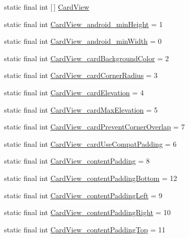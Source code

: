 \begin{DoxyCompactItemize}
\item 
static final int \mbox{[}$\,$\mbox{]} \hyperlink{classproject4_1_1xaria_1_1R_1_1styleable_abef2e3d3e2b11dd786470094dbc57ea4}{Card\+View}
\item 
static final int \hyperlink{classproject4_1_1xaria_1_1R_1_1styleable_a2713d27646c85746d8ab8bd6ccc6c04f}{Card\+View\+\_\+android\+\_\+min\+Height} = 1
\item 
static final int \hyperlink{classproject4_1_1xaria_1_1R_1_1styleable_a656ba8dea65186ef0004bd7170c8fa84}{Card\+View\+\_\+android\+\_\+min\+Width} = 0
\item 
static final int \hyperlink{classproject4_1_1xaria_1_1R_1_1styleable_ab56702194685aec3a36f901e12d1f432}{Card\+View\+\_\+card\+Background\+Color} = 2
\item 
static final int \hyperlink{classproject4_1_1xaria_1_1R_1_1styleable_af0c0306982a503b9a005aebafa2f8251}{Card\+View\+\_\+card\+Corner\+Radius} = 3
\item 
static final int \hyperlink{classproject4_1_1xaria_1_1R_1_1styleable_a54bee07e94f96a7a6825da65d58be17f}{Card\+View\+\_\+card\+Elevation} = 4
\item 
static final int \hyperlink{classproject4_1_1xaria_1_1R_1_1styleable_a4be9ec95637f04c772f94899092a55f8}{Card\+View\+\_\+card\+Max\+Elevation} = 5
\item 
static final int \hyperlink{classproject4_1_1xaria_1_1R_1_1styleable_a335e1ca3184d29fcbeeec527602ab895}{Card\+View\+\_\+card\+Prevent\+Corner\+Overlap} = 7
\item 
static final int \hyperlink{classproject4_1_1xaria_1_1R_1_1styleable_a82b54eed1db5f90c00cd724eaee04e6e}{Card\+View\+\_\+card\+Use\+Compat\+Padding} = 6
\item 
static final int \hyperlink{classproject4_1_1xaria_1_1R_1_1styleable_a870488b5d76324f10a774fa2fd3498c8}{Card\+View\+\_\+content\+Padding} = 8
\item 
static final int \hyperlink{classproject4_1_1xaria_1_1R_1_1styleable_aefde665737e7cce8b5bf40fce5b28dc3}{Card\+View\+\_\+content\+Padding\+Bottom} = 12
\item 
static final int \hyperlink{classproject4_1_1xaria_1_1R_1_1styleable_a8e9c7e0442a01fba035b5de476459104}{Card\+View\+\_\+content\+Padding\+Left} = 9
\item 
static final int \hyperlink{classproject4_1_1xaria_1_1R_1_1styleable_a7989c5540f66e224b4c50c22a263699d}{Card\+View\+\_\+content\+Padding\+Right} = 10
\item 
static final int \hyperlink{classproject4_1_1xaria_1_1R_1_1styleable_a3b92595b1e8cae542bff3b32ab58c2b1}{Card\+View\+\_\+content\+Padding\+Top} = 11

\end{DoxyCompactItemize}
